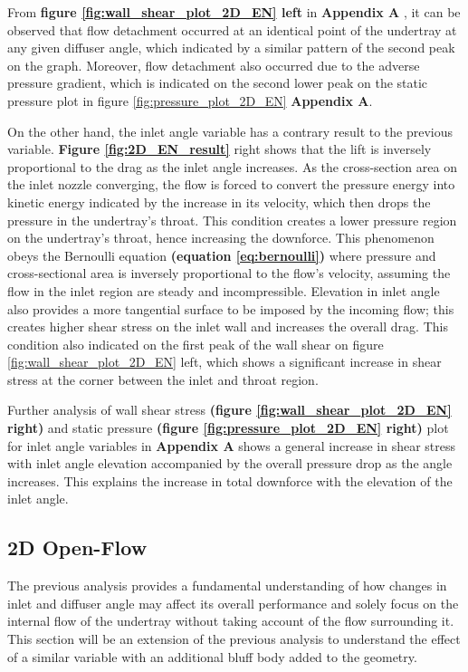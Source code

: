 \noindent From \textbf{figure \ref{fig:wall_shear_plot_2D_EN} left} in \textbf{Appendix A} ,  it can be observed that flow detachment occurred at an identical point of the undertray at any given diffuser angle, which indicated by a similar pattern of the second peak on the graph. Moreover,  flow detachment also occurred due to the adverse pressure gradient, which is indicated on the second lower peak on the static pressure plot in figure \ref{fig:pressure_plot_2D_EN} \textbf{Appendix A}.

\noindent On the other hand, the inlet angle variable has a contrary result to the previous variable. \textbf{Figure \ref{fig:2D_EN_result}} right shows that the lift is inversely proportional to the drag as the inlet angle increases.  As the cross-section area on the inlet nozzle converging, the flow is forced to convert the pressure energy into kinetic energy indicated by the increase in its velocity, which then drops the pressure in the undertray's throat. This condition creates a lower pressure region on the undertray's throat, hence increasing the downforce. This phenomenon obeys the Bernoulli equation \textbf{ (equation \ref{eq:bernoulli})} where pressure and cross-sectional area is inversely proportional to the flow's velocity, assuming the flow in the inlet region are steady and incompressible.  Elevation in inlet angle also provides a more tangential surface to be imposed by the incoming flow; this creates higher shear stress on the inlet wall and increases the overall drag. This condition also indicated on the first peak of the wall shear on figure \ref{fig:wall_shear_plot_2D_EN} left, which shows a significant increase in shear stress at the corner between the inlet and throat region.

\noindent Further analysis of wall shear stress \textbf{(figure \ref{fig:wall_shear_plot_2D_EN} right)} and static pressure \textbf{(figure \ref{fig:pressure_plot_2D_EN} right)} plot for inlet angle variables in \textbf{Appendix A} shows a general increase in shear stress with inlet angle elevation accompanied by the overall pressure drop as the angle increases. This explains the increase in total downforce with the elevation of the inlet angle.



\subsection{2D Open-Flow}
The previous analysis provides a fundamental understanding of how changes in inlet and diffuser angle may affect its overall performance and solely focus on the internal flow of the undertray without taking account of the flow surrounding it. This section will be an extension of the previous analysis to understand the effect of a similar variable with an additional bluff body added to the geometry. 

